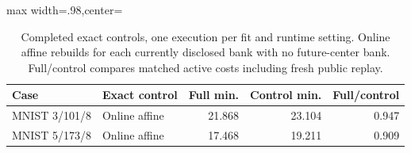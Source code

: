 \begin{table}[tbp]
\centering
\caption{Completed exact controls, one execution per fit and runtime setting. Online affine rebuilds for each currently disclosed bank with no future-center bank. Full/control compares matched active costs including fresh public replay.}
\label{tab:optimized-exact}
\begin{adjustbox}{max width=.98\textwidth,center=\textwidth}
\begin{tabular}{llrrr}
\toprule
Case & Exact control & Full min. & Control min. & Full/control\\
\midrule
MNIST 3/101/8 & Online affine & 21.868 & 23.104 & 0.947\\
MNIST 5/173/8 & Online affine & 17.468 & 19.211 & 0.909\\
\bottomrule
\end{tabular}
\end{adjustbox}
\end{table}
